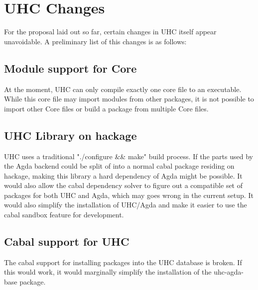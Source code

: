 \documentclass[12pt, a4paper, twoside]{report}
\begin{document}
\section{UHC Changes}
For the proposal laid out so far, certain changes in UHC itself appear
unavoidable. A preliminary list of this changes is as follows:


\subsection{Module support for Core}
At the moment, UHC can only compile exactly one core file to an executable.
While this core file may import modules from other packages, it is not possible
to import other Core files or build a package from multiple Core files.

\subsection{UHC Library on hackage}
UHC uses a traditional "./configure \&\& make" build process. If the parts used by the
Agda backend could be split of into a normal cabal package residing on hackage,
making this library a hard dependency of Agda might be possible.
It would also allow the cabal dependency solver to figure out a compatible
set of packages for both UHC and Agda, which may goes wrong in the current setup.
It would also simplify the installation of UHC/Agda and make it easier to use the cabal sandbox feature for development.

\subsection{Cabal support for UHC}
The cabal support for installing packages into the UHC database is broken. If this would work, it
would marginally simplify the installation of the uhc-agda-base package.


{}

\end{document}
